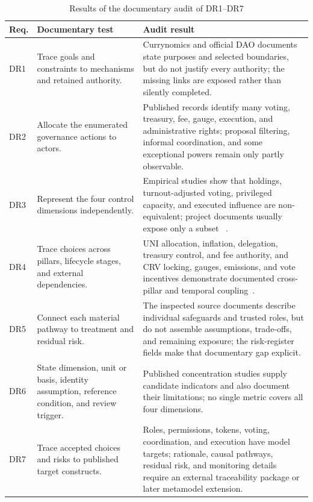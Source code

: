 \documentclass[referee,sn-basic]{sn-jnl}
\begin{document}
\begin{table}[t]
\caption{Results of the documentary audit of DR1--DR7}
\label{tab:documentary-audit}
\centering
\footnotesize
\begin{tabularx}{\linewidth}{@{}p{.07\linewidth}p{.29\linewidth}X@{}}
\toprule
Req. & Documentary test & Audit result \\
\midrule
DR1 & Trace goals and constraints to mechanisms and retained authority. &
Currynomics and official DAO documents state purposes and selected boundaries,
but do not justify every authority; the missing links are exposed rather than
silently completed. \\
DR2 & Allocate the enumerated governance actions to actors. & Published records
identify many voting, treasury, fee, gauge, execution, and administrative
rights; proposal filtering, informal coordination, and some exceptional powers
remain only partly observable. \\
DR3 & Represent the four control dimensions independently. & Empirical studies
show that holdings, turnout-adjusted voting, privileged capacity, and executed
influence are non-equivalent; project documents usually expose only a subset
~\cite{Fritsch2024VotingPower,Kitzler2025Governance,
Eisermann2025Concentration}. \\
DR4 & Trace choices across pillars, lifecycle stages, and external dependencies.
& UNI allocation, inflation, delegation, treasury control, and fee authority,
and CRV locking, gauges, emissions, and vote incentives demonstrate documented
cross-pillar and temporal coupling~\cite{Uniswap2020UNI,Uniswap2021V3,
CurveDAO2020,CurveDocs2026}. \\
DR5 & Connect each material pathway to treatment and residual risk. & The
inspected source documents describe individual safeguards and trusted roles,
but do not assemble
assumptions, trade-offs, and remaining exposure; the risk-register fields make
that documentary gap explicit. \\
DR6 & State dimension, unit or basis, identity assumption, reference condition,
and review trigger. & Published concentration studies supply candidate
indicators and also document their limitations; no single metric covers all
four dimensions. \\
DR7 & Trace accepted choices and risks to published target constructs. & Roles,
permissions, tokens, voting, coordination, and execution have model targets;
rationale, causal pathways, residual risk, and monitoring details require an
external traceability package or later metamodel extension. \\
\bottomrule
\end{tabularx}
\end{table}
\end{document}
